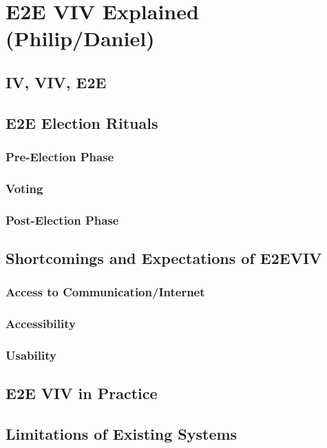 \chapter{E2E VIV Explained (Philip/Daniel)}
\label{chapter:e2e_viv_explained}

\section{IV, VIV, E2E}
\section{E2E Election Rituals}
\subsection{Pre-Election Phase}
\subsection{Voting}
\subsection{Post-Election Phase}
\section{Shortcomings and Expectations of E2EVIV}
\subsection{Access to Communication/Internet}
\subsection{Accessibility}
\subsection{Usability}
\section{E2E VIV in Practice}
\section{Limitations of Existing Systems}
